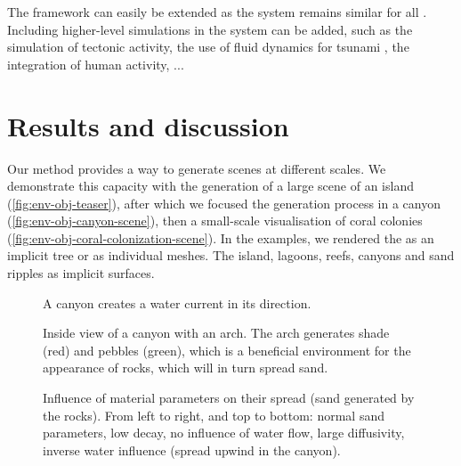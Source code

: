 \midConclusion

The framework can easily be extended as the  system remains similar for all . Including higher-level simulations in the  system can be added, such as the simulation of tectonic activity, the use of fluid dynamics for tsunami , the integration of human activity, ...

\section{Results and discussion}
\label{sec:env-obj-results}
Our method provides a way to generate scenes at different scales. We demonstrate this capacity with the generation of a large scene of an island (\cref{fig:env-obj-teaser}), after which we focused the generation process in a canyon (\cref{fig:env-obj-canyon-scene}), then a small-scale visualisation of coral colonies (\cref{fig:env-obj-coral-colonization-scene}).
In the examples, we rendered the  as an implicit tree or as individual meshes. The island, lagoons, reefs, canyons and sand ripples as implicit surfaces.

\begin{figure}
\caption{A canyon creates a water current in its direction.}
\label{fig:env-obj-canyon-flow}
\end{figure}

\begin{figure}
\caption{Inside view of a canyon with an arch. The arch generates shade (red) and pebbles (green), which is a beneficial environment for the appearance of rocks, which will in turn spread sand.}
\label{fig:env-obj-canyon-inside-with-arch}
\end{figure}

\begin{figure}
\caption{Influence of material parameters on their spread (sand generated by the rocks). From left to right, and top to bottom: normal sand parameters, low decay, no influence of water flow, large diffusivity, inverse water influence (spread upwind in the canyon).}
\label{fig:env-obj-material-diffusion-parameters}
\end{figure}

